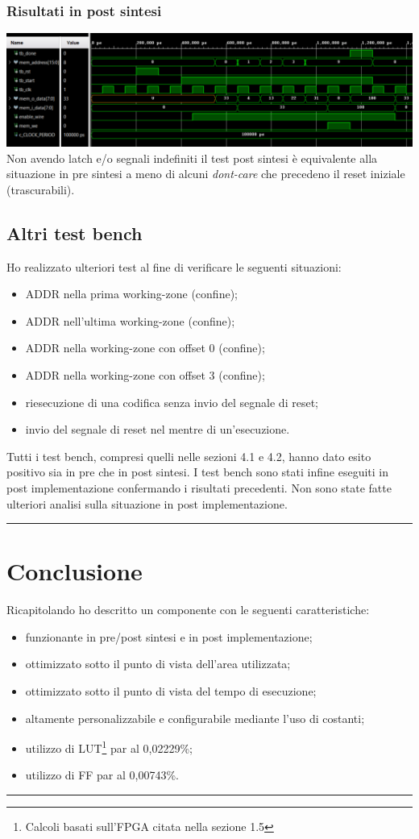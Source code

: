 \documentclass{article}
\begin{document}
\subsubsection{Risultati in post sintesi}
\includegraphics[width=\textwidth]{tb1-ps.png}
Non avendo latch e/o segnali indefiniti il test post sintesi è equivalente alla situazione in pre sintesi a meno di alcuni \textit{dont-care} che precedeno il reset iniziale (trascurabili).
\subsection{Altri test bench}
Ho realizzato ulteriori test al fine di verificare le seguenti situazioni:
\begin{itemize}
	\item ADDR nella prima working-zone (confine);
	\item ADDR nell'ultima working-zone (confine);
	\item ADDR nella working-zone con offset 0 (confine);
	\item ADDR nella working-zone con offset 3 (confine);
	\item riesecuzione di una codifica senza invio del segnale di reset;
	\item invio del segnale di reset nel mentre di un'esecuzione.
\end{itemize}
Tutti i test bench, compresi quelli nelle sezioni 4.1 e 4.2, hanno dato esito positivo sia in pre che in post sintesi.
I test bench sono stati infine eseguiti in post implementazione confermando i risultati precedenti.
Non sono state fatte ulteriori analisi sulla situazione in post implementazione.

\noindent\rule{\textwidth}{0.5pt}
\newpage
\section{Conclusione}
Ricapitolando ho descritto un componente con le seguenti caratteristiche:
\begin{itemize}
	\item funzionante in pre/post sintesi e in post implementazione;
	\item ottimizzato sotto il punto di vista dell'area utilizzata;
	\item ottimizzato sotto il punto di vista del tempo di esecuzione;
	\item altamente personalizzabile e configurabile mediante l'uso di costanti;
	\item utilizzo di LUT\footnote{Calcoli basati sull'FPGA citata nella sezione 1.5\label{fn}}  par al 0,02229\%;
	\item utilizzo di FF par al 0,00743\%.
\end{itemize}

\noindent\rule{\textwidth}{0.5pt}
\end{document}
